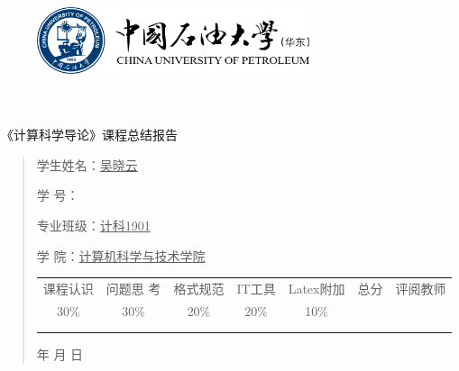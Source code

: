 \documentclass{article}
\renewcommand{\today}{\number\year 年 \number\month 月 \number\day 日}
\begin{document}
\begin{figure}
    \centering
    \includegraphics[width=8cm]{upc.png}

    \label{figupc}
\end{figure}

	\begin{center}
		\quad \\
		\quad \\
		\heiti \fontsize{45}{17} \quad \quad \quad 
		\vskip 1.5cm
		\heiti {} 《计算科学导论》课程总结报告
	\end{center}
	\vskip 2.0cm
		
	\begin{quotation}
		\doublespacing
		
        \par\setlength\parindent{7em}
		\quad 

		学生姓名：\underline{\qquad  吴晓云 \qquad \qquad}

		学\hspace{0.61cm} 号：\underline{\qquad}
		
		专业班级：\underline{\qquad 计科1901 \qquad  }
		
        学\hspace{0.61cm} 院：\underline{计算机科学与技术学院}
		\vskip 2cm
		\centering
		\begin{table}[h]
            \centering 
            \begin{tabular}{|c|c|c|c|c|c|c|}
                \hline
                课程认识 & 问题思 考 & 格式规范  & IT工具  & Latex附加  & 总分 & 评阅教师 \\
                30\% & 30\% & 20\% & 20\% & 10\% &  &  \\
                \hline
                 & & & & & &\\
                & & & & & &\\
                \hline
            \end{tabular}
        \end{table}
		\vskip 2cm
		\today
	\end{quotation}
\end{document}
